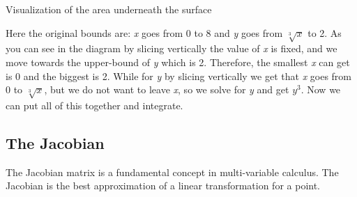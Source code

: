 \begin{center}

    Visualization of the area underneath the surface
    \smallskip

\end{center}

Here the original bounds are: \emph{x} goes from 0 to 8 and \emph{y} goes from \(\sqrt[3]{x}\) to 2.
As you can see in the diagram by slicing vertically the value of \emph{x} is fixed, and we move 
towards the upper-bound of \emph{y} which is 2.
Therefore, the smallest \emph{x} can get is 0 and the biggest is 2. While for \emph{y} by slicing 
vertically we get that \emph{x} goes from 0 to \(\sqrt[3]{x}\), but 
we do not want to leave \emph{x}, so we solve for \emph{y} and get \(y^3\). 
Now we can put all of this together and integrate.


\subsection{The Jacobian}

The Jacobian matrix is a fundamental concept in multi-variable calculus. The Jacobian is the best
approximation of a linear transformation for a point.

